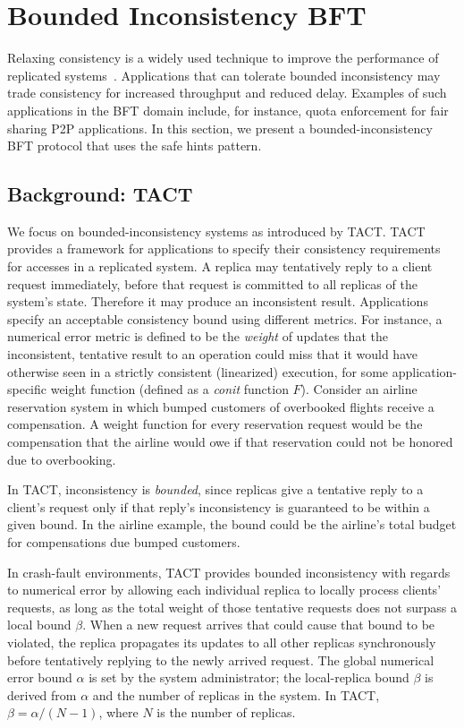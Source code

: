 \documentclass[twocolumn,10pt]{article}
\begin{document}
\section{Bounded Inconsistency BFT}
\label{sec:bihq}

Relaxing consistency is a widely used technique to improve the
performance of replicated
systems~\cite{Satyanarayanan2002,Terry1995,Yu2002}.  Applications that
can tolerate bounded inconsistency may trade consistency for increased
throughput and reduced delay. Examples of such applications in the BFT
domain include, for instance, quota enforcement for fair sharing P2P
applications.  In this section, we present a bounded-inconsistency BFT
protocol that uses the safe hints pattern.

\subsection{Background: TACT}
We focus on bounded-inconsistency systems as introduced by
TACT\cite{Yu2002}.  TACT provides a framework for applications to
specify their consistency requirements for accesses in a replicated
system.  A replica may tentatively reply to a client request
immediately, before that request is committed to all replicas of the
system's state. Therefore it may produce an inconsistent result.
Applications specify an acceptable consistency bound using different
metrics. For instance, a numerical error metric is defined to be the
\emph{weight} of updates that the inconsistent, tentative
result to an operation could miss that 
it would have otherwise seen in a strictly consistent
(linearized) execution, for some
application-specific weight function (defined as a
\emph{conit} function $F$).
Consider an airline reservation system in which
bumped customers of overbooked flights receive a compensation.
A weight
function for every reservation request would be the compensation that
the airline would owe if that reservation could not be honored due to
overbooking.

In TACT, inconsistency is \emph{bounded}, since replicas give a
tentative reply to a client's request only if that reply's
inconsistency is guaranteed to be within a given bound.  In the
airline example, the bound could be the airline's total budget for
compensations due bumped customers.

In crash-fault environments, TACT provides bounded inconsistency with regards to
numerical error by allowing each individual replica to locally process clients' requests, as
long as the total weight of those tentative requests does not surpass a local bound
$\beta$. When a new request arrives that could cause that bound to be
violated, the replica propagates its updates to all other replicas
synchronously before tentatively replying to the newly arrived
request.  The global numerical error bound $\alpha$ is set by the
system administrator; the local-replica bound $\beta$ is derived from
$\alpha$ and the number of replicas in the system. In TACT, $\beta=\alpha/(N-1)$, where
$N$ is the number of replicas.
\end{document}
